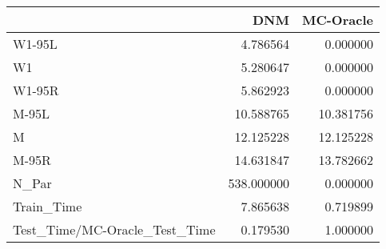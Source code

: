 \begin{tabular}{lrr}
\toprule
{} &         DNM &  MC-Oracle \\
\midrule
W1-95L                        &    4.786564 &   0.000000 \\
W1                            &    5.280647 &   0.000000 \\
W1-95R                        &    5.862923 &   0.000000 \\
M-95L                         &   10.588765 &  10.381756 \\
M                             &   12.125228 &  12.125228 \\
M-95R                         &   14.631847 &  13.782662 \\
N\_Par                         &  538.000000 &   0.000000 \\
Train\_Time                    &    7.865638 &   0.719899 \\
Test\_Time/MC-Oracle\_Test\_Time &    0.179530 &   1.000000 \\
\bottomrule
\end{tabular}
